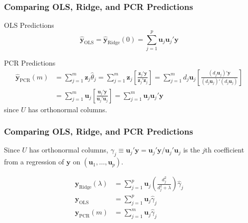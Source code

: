 \begin{frame}
  \frametitle{Comparing OLS, Ridge, and PCR Predictions}

\begin{block}{OLS Predictions}
  \vspace{-1em}
  \[
    \widehat{\mathbf{y}}_{\text{OLS}} = \widehat{\mathbf{y}}_{\text{Ridge}}(0) = \sum_{j=1}^p   \mathbf{u}_j\mathbf{u}_j'\mathbf{y} 
  \]
\end{block}

\begin{block}{PCR Predictions}
  \begin{align*}
    \widehat{\mathbf{y}}_{\text{PCR}}(m) &= \sum_{j = 1}^m \mathbf{z}_j\widehat{\theta}_j = \sum_{j=1}^{m} \mathbf{z}_j \left[\frac{\mathbf{z}_j' \mathbf{y}}{\mathbf{z}_j' \mathbf{z}_j}\right] = \sum_{j=1}^m d_j \mathbf{u}_j \left[ \frac{(d_j \mathbf{u}_j)' \mathbf{y}}{(d_j \mathbf{u}_j)'(d_j \mathbf{u}_j)} \right]\\
    &= \sum_{j=1}^m \mathbf{u}_j \left[ \frac{\mathbf{u}_j' \mathbf{y}}{\mathbf{u}_j'\mathbf{u}_j} \right] = \sum_{j=1}^m \mathbf{u}_j \mathbf{u}_j' \mathbf{y}
      \end{align*}
since $U$ has orthonormal columns.
\end{block}

\end{frame}
\begin{frame}
  \frametitle{Comparing OLS, Ridge, and PCR Predictions}

  Since $U$ has orthonormal columns, $\widehat{\gamma}_j \equiv \mathbf{u}_j' \mathbf{y} = \mathbf{u}_j' \mathbf{y}/\mathbf{u}_j' \mathbf{u}_j$ is the $j$th coefficient from a regression of $\mathbf{y}$ on $(\mathbf{u}_1, \dots, \mathbf{u}_p)$.

  \begin{align*}
    \widehat{\mathbf{y}}_{\text{Ridge}}(\lambda) &= \sum_{j=1}^p   \mathbf{u}_j\left( \frac{d_j^2}{d_j^2 + \lambda} \right)\widehat{\gamma}_j\\
    \widehat{\mathbf{y}}_{\text{OLS}} &= \sum_{j=1}^p   \mathbf{u}_j \widehat{\gamma}_j\\ 
    \widehat{\mathbf{y}}_{\text{PCR}}(m) &= \sum_{j=1}^m \mathbf{u}_j \widehat{\gamma}_j 
  \end{align*}

\end{frame}
